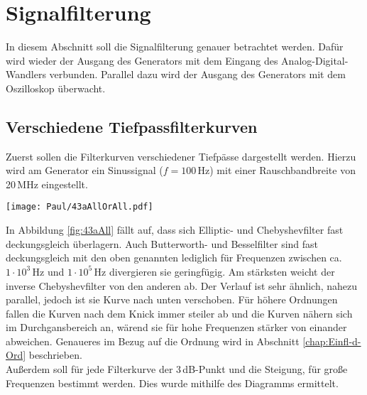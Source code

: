 \section{Signalfilterung}
In diesem Abschnitt soll die Signalfilterung genauer betrachtet werden. Dafür wird wieder der Ausgang des Generators mit dem Eingang des Analog-Digital-Wandlers verbunden. Parallel dazu wird der Ausgang des Generators mit dem Oszilloskop überwacht.

\subsection{Verschiedene Tiefpassfilterkurven}
\label{sec:VerTi}
Zuerst sollen die Filterkurven verschiedener Tiefpässe dargestellt werden. Hierzu wird am Generator ein Sinussignal ($f=100$\,Hz) mit einer Rauschbandbreite von 20\,MHz eingestellt.\\


\begin{center}
    \texttt{[image: Paul/43aAllOrAll.pdf]}
    \label{fig:43aAll}
\end{center}

In Abbildung \ref{fig:43aAll} fällt auf, dass sich Elliptic- und Chebyshevfilter fast deckungsgleich überlagern. Auch Butterworth- und Besselfilter sind fast deckungsgleich mit den oben genannten lediglich für Frequenzen zwischen ca. $1\cdot 10^3$\,Hz und $1\cdot 10^5$\,Hz divergieren sie geringfügig. Am stärksten weicht der inverse Chebyshevfilter von den anderen ab. Der Verlauf ist sehr ähnlich, nahezu parallel, jedoch ist sie Kurve nach unten verschoben. Für höhere Ordnungen fallen die Kurven nach dem Knick immer steiler ab und die Kurven nähern sich im Durchgansbereich an, wärend sie für hohe Frequenzen stärker von einander abweichen. Genaueres im Bezug auf die Ordnung wird in Abschnitt \ref{chap:Einfl-d-Ord} beschrieben.\\

Außerdem soll  für jede Filterkurve der 3\,dB-Punkt und die Steigung, für große Frequenzen bestimmt werden.
Dies wurde mithilfe des Diagramms ermittelt.

